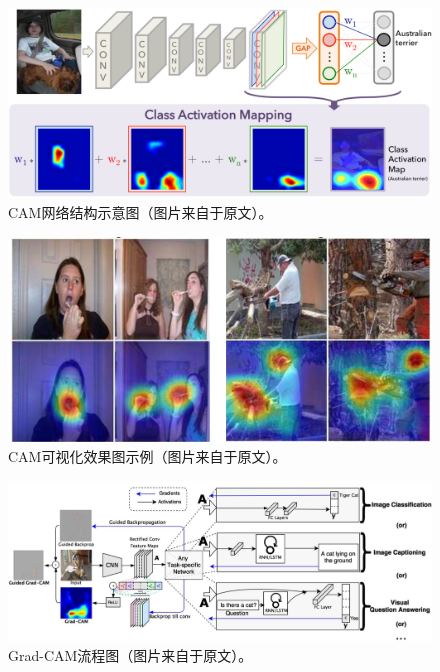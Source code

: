 \begin{figure}[h]
	\centering
	\includegraphics[width=1.0\textwidth]{figure/cam_arichitecture}
	\caption{CAM网络结构示意图（图片来自于原文）。}
	\label{fig:cam_arichitecture}
\end{figure}
\begin{figure}[h]
	\centering
	\includegraphics[width=1.0\textwidth]{figure/cam_example}
	\caption{CAM可视化效果图示例（图片来自于原文）。}
	\label{fig:cam_example}
\end{figure}
\begin{figure}[h]
	\centering
	\includegraphics[width=1.0\textwidth]{figure/grad_cam_architecture}
	\caption{Grad-CAM流程图（图片来自于原文）。}
	\label{fig:grad_cam_architecture}
\end{figure}
